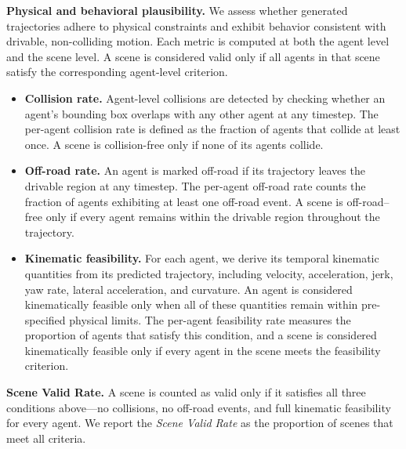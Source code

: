 \documentclass[10pt,twocolumn,letterpaper]{article}
\theoremstyle{plain}
\theoremstyle{remark}
\renewcommand{\paragraph}[1]{\vspace{.5em}\noindent\textbf{#1.}}
\begin{document}
\paragraph{Physical and behavioral plausibility}
We assess whether generated trajectories adhere to physical
constraints and exhibit behavior consistent with drivable,
non-colliding motion.  Each metric is
computed at both the agent level and the scene
level.  A scene is considered valid only if all agents in
that scene satisfy the corresponding agent-level criterion.

\begin{itemize}
    \item \textbf{Collision rate.}  
    Agent-level collisions are detected by checking whether an
    agent's bounding box overlaps with any other agent at any
    timestep.  The per-agent collision rate is defined as the
    fraction of agents that collide at least once.  
    A scene is collision-free only if none of its agents collide.

    \item \textbf{Off-road rate.}  
    An agent is marked off-road if its trajectory leaves the
    drivable region at any timestep.  The per-agent off-road rate
    counts the fraction of agents exhibiting at least one off-road
    event.  
    A scene is off-road–free only if every agent remains within
    the drivable region throughout the trajectory.

    \item \textbf{Kinematic feasibility.}  
    For each agent, we derive its temporal kinematic quantities from its predicted trajectory, including velocity, acceleration, jerk, yaw rate, lateral acceleration, and curvature. An agent is considered kinematically feasible only when all of these quantities remain within pre-specified physical limits. The per-agent feasibility rate measures the proportion of agents that satisfy this condition, and a scene is considered kinematically feasible only if every agent in the scene meets the feasibility criterion.
\end{itemize}

\paragraph{Scene Valid Rate}
A scene is counted as valid only if it satisfies all three conditions above---no collisions, no off-road events, and full kinematic feasibility for every agent. We report the \textit{Scene Valid Rate} as the proportion of scenes that meet all criteria.
\end{document}
